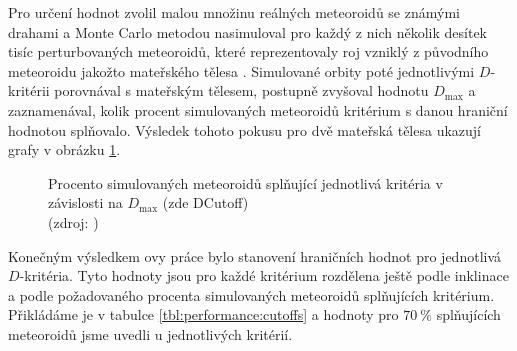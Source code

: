\smallskip

Pro určení hodnot zvolil malou množinu reálných meteoroidů se známými drahami a Monte Carlo metodou nasimuloval pro každý z nich několik desítek tisíc perturbovaných meteoroidů, které reprezentovaly roj vzniklý z původního meteoroidu jakožto mateřského tělesa \cite{galligan}. Simulované orbity poté jednotlivými $D$-kritérii porovnával s mateřským tělesem, postupně zvyšoval hodnotu $D_\text{max}$ a zaznamenával, kolik procent simulovaných meteoroidů kritérium s danou hraniční hodnotou splňovalo. Výsledek tohoto pokusu pro dvě mateřská tělesa ukazují grafy v obrázku \ref{img:performance:recovery}.

\begin{figure}[ht]
    \centering
    \hfill
    \caption[Procento simulovaných meteoroidů splňující $D$-kritéria]{
        Procento simulovaných meteoroidů splňující jednotlivá kritéria v závislosti na $D_\text{max}$ (zde \textsf{DCutoff})\\
        {\small (zdroj: \cite{galligan})}
    }
    \label{img:performance:recovery}
\end{figure}

\medskip

Konečným výsledkem \citeauthor{galligan}ovy práce bylo stanovení hraničních hodnot pro jednotlivá $D$-kritéria. Tyto hodnoty jsou pro každé kritérium rozdělena ještě podle inklinace a podle požadovaného procenta simulovaných meteoroidů splňujících kritérium. Přikládáme je v tabulce \ref{tbl:performance:cutoffs} a hodnoty pro $70\:\%$ splňujících meteoroidů jsme uvedli u jednotlivých kritérií.

